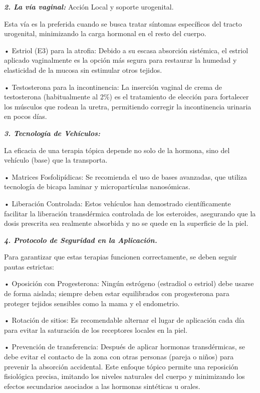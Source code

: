 \documentclass[
  spanish,
]{article}
\begin{document}
\textbf{\emph{2. La vía vaginal:}} Acción Local y soporte urogenital.

Esta vía es la preferida cuando se busca tratar síntomas específicos del tracto urogenital, minimizando la carga hormonal en el resto del cuerpo.

• Estriol (E3) para la atrofia: Debido a su escasa absorción sistémica, el estriol aplicado vaginalmente es la opción más segura para restaurar la humedad y elasticidad de la mucosa sin estimular otros tejidos.

• Testosterona para la incontinencia: La inserción vaginal de crema de testosterona (habitualmente al 2\%) es el tratamiento de elección para fortalecer los músculos que rodean la uretra, permitiendo corregir la incontinencia urinaria en pocos días.

\textbf{\emph{3. Tecnología de Vehículos:}}

La eficacia de una terapia tópica depende no solo de la hormona, sino del vehículo (base) que la transporta.

• Matrices Fosfolipídicas: Se recomienda el uso de bases avanzadas, que utiliza tecnología de bicapa laminar y micropartículas nanosómicas.

• Liberación Controlada: Estos vehículos han demostrado científicamente facilitar la liberación transdérmica controlada de los esteroides, asegurando que la dosis prescrita sea realmente absorbida y no se quede en la superficie de la piel.

\textbf{\emph{4. Protocolo de Seguridad en la Aplicación.}}

Para garantizar que estas terapias funcionen correctamente, se deben seguir pautas estrictas:

• Oposición con Progesterona: Ningún estrógeno (estradiol o estriol) debe usarse de forma aislada; siempre deben estar equilibrados con progesterona para proteger tejidos sensibles como la mama y el endometrio.

• Rotación de sitios: Es recomendable alternar el lugar de aplicación cada día para evitar la saturación de los receptores locales en la piel.

• Prevención de transferencia: Después de aplicar hormonas transdérmicas, se debe evitar el contacto de la zona con otras personas (pareja o niños) para prevenir la absorción accidental.
Este enfoque tópico permite una reposición fisiológica precisa, imitando los niveles naturales del cuerpo y minimizando los efectos secundarios asociados a las hormonas sintéticas u orales.
\end{document}
